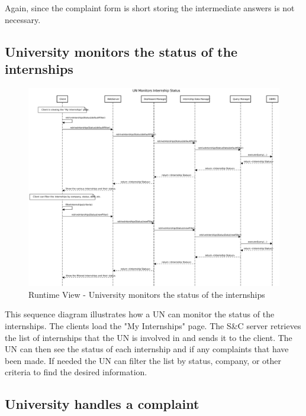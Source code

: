 \par Again, since the complaint form is short storing the intermediate answers is not necessary.

\subsection{University monitors the status of the internships}
\label{sub:university-monitors-the-status-of-the-internships}%

\begin{figure}[H]
      \centering
      \includegraphics[width=1.0\textwidth]{Images/RV_12.pdf}
      \caption{Runtime View - University monitors the status of the internships}
      \label{fig:rv-un-monitors-internships}
\end{figure}

\par This sequence diagram illustrates how a UN can monitor the status of the internships. The clients load the "My
Internships" page. The S\&C server retrieves the list of internships that the UN is involved in and sends it to the
client. The UN can then see the status of each internship and if any complaints that have been made. If needed the UN
can filter the list by status, company, or other criteria to find the desired information.

\subsection{University handles a complaint}
\label{sub:university-handles-a-complaint}%

